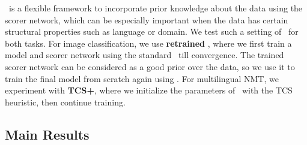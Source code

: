 \dds~is a flexible framework to incorporate prior knowledge about the data using the scorer network, which can be especially important when the data has certain structural properties such as language or domain. We test such a setting of \dds~for both tasks. For image classification, we use \textbf{retrained \dds}, where we first train a model and scorer network using the standard \dds~till convergence. The trained scorer network can be considered as a good prior over the data, so we use it to train the final model from scratch again using \dds. For multilingual NMT, we experiment with \textbf{TCS+\dds}, where we initialize the parameters of \dds~with the TCS heuristic, then continue training. 



\subsection{Main Results}


